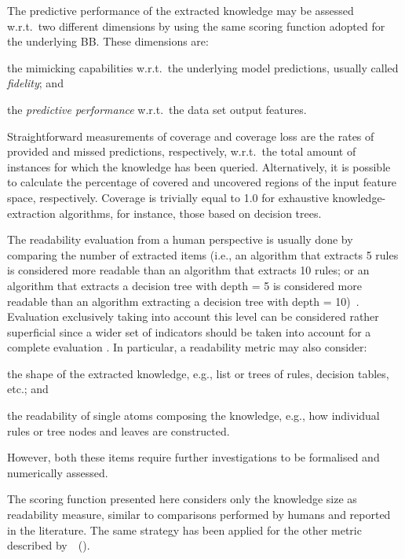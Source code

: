 \documentclass{article}
\newcommand{\citet}[1]{\citeauthor{#1}~(\citeyear{#1})}
\newenvironment{inlinelist}{\begin{enumerate*}[label=\emph{(\roman{*})}]}{\end{enumerate*}}
\begin{document}
The predictive performance of the extracted knowledge may be assessed w.r.t.\ two different dimensions by using the same scoring function adopted for the underlying BB.
%
These dimensions are:
%
\begin{inlinelist}
	\item the mimicking capabilities w.r.t.\ the underlying model predictions, usually called \emph{fidelity}; and
	\item the \emph{predictive performance} w.r.t.\ the data set output features.
\end{inlinelist}

Straightforward measurements of coverage and coverage loss are the rates of provided and missed predictions, respectively, w.r.t.\ the total amount of instances for which the knowledge has been queried.
%
Alternatively, it is possible to calculate the percentage of covered and uncovered regions of the input feature space, respectively.
%
Coverage is trivially equal to 1.0 for exhaustive knowledge-extraction algorithms, for instance, those based on decision trees.

The readability evaluation from a human perspective is usually done by comparing the number of extracted items (i.e., an algorithm that extracts 5 rules is considered more readable than an algorithm that extracts 10 rules; or an algorithm that extracts a decision tree with depth = 5 is considered more readable than an algorithm extracting a decision tree with depth = 10)~\cite{czarnowski2016}.
% 
Evaluation exclusively taking into account this level can be considered rather superficial since a wider set of indicators should be taken into account for a complete evaluation \cite{sabbatini2022-metrics}.
%
In particular, a readability metric may also consider:
%
\begin{inlinelist}
	\item the shape of the extracted knowledge, e.g., list or trees of rules, decision tables, etc.; and
	\item the readability of single atoms composing the knowledge, e.g., how individual rules or tree nodes and leaves are constructed.
\end{inlinelist}
%
However, both these items require further investigations to be formalised and numerically assessed.

The scoring function presented here considers only the knowledge size as readability measure, similar to comparisons performed by humans and reported in the literature.
%
The same strategy has been applied for the other metric described by~\citet{skemetrics-aaai2023}.
\end{document}
